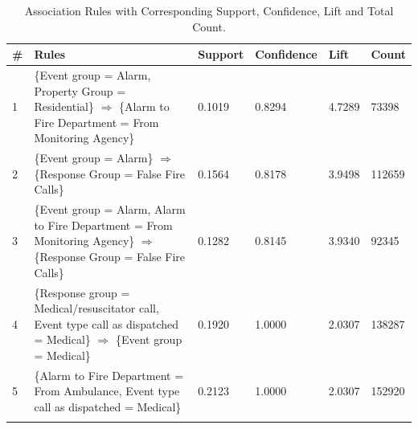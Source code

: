 \documentclass[12pt,letterpaper, oneside]
{article}
\begin{document}
\begin{table}[h]
	\hspace*{-0.3cm}
	\begin{tabular}{p{} p{} p{} p{} p{} p{}} \toprule
		\# & Rules & Support & Confidence & Lift & Count \\ \midrule
		1 & \{Event group = Alarm, Property Group = Residential\} $\Rightarrow$ \{Alarm to Fire Department = From Monitoring Agency\} & 0.1019 & 0.8294 & 4.7289 & 73398 \\ \midrule 
		2 & \{Event group = Alarm\} $\Rightarrow$ \{Response Group = False Fire Calls\} & 0.1564 & 0.8178 & 3.9498 & 112659 \\ \midrule
		3 & \{Event group = Alarm, Alarm to Fire Department = From Monitoring Agency\} $\Rightarrow$ \{Response Group = False Fire Calls\} & 0.1282 & 0.8145 & 3.9340 & 92345 \\ \midrule
		4 & \{Response group = Medical/resuscitator call, Event type call as dispatched = Medical\} $\Rightarrow$ \{Event group = Medical\} & 0.1920 & 1.0000 & 2.0307 & 138287 \\ \midrule
		5 & \{Alarm to Fire Department = From Ambulance, Event type call as dispatched = Medical\} & 0.2123 & 1.0000 & 2.0307 & 152920 \\
		\caption{
			Association Rules with Corresponding Support, Confidence, Lift and Total Count. 
			\label{tab:arules}
		} 


	\end{tabular}
\end{table}
\end{document}
